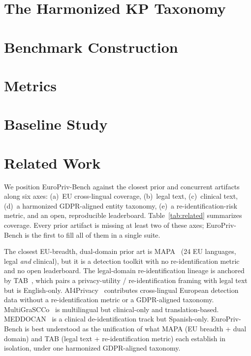 \documentclass[11pt]{article}
\begin{document}
\section{The Harmonized KP Taxonomy}

\section{Benchmark Construction}

\section{Metrics}

\section{Baseline Study}

\section{Related Work}
\label{sec:related}
We position EuroPriv-Bench against the closest prior and concurrent artifacts along six axes:
(a)~EU cross-lingual coverage, (b)~legal text, (c)~clinical text, (d)~a harmonized GDPR-aligned
entity taxonomy, (e)~a re-identification-risk metric, and an open, reproducible leaderboard.
Table~\ref{tab:related} summarizes coverage. Every prior artifact is missing at least two of these
axes; EuroPriv-Bench is the first to fill all of them in a single suite.

The closest EU-breadth, dual-domain prior art is MAPA~\cite{mapa_toolkit} (24 EU languages, legal
\emph{and} clinical), but it is a detection toolkit with no re-identification metric and no open
leaderboard. The legal-domain re-identification lineage is anchored by TAB~\cite{pilan2022tab},
which pairs a privacy-utility / re-identification framing with legal text but is English-only.
AI4Privacy~\cite{ai4privacy_openpii} contributes cross-lingual European detection data without a
re-identification metric or a GDPR-aligned taxonomy. MultiGraSCCo~\cite{multigrascco2026} is
multilingual but clinical-only and translation-based. MEDDOCAN~\cite{meddocan2019} is a
clinical de-identification track but Spanish-only. EuroPriv-Bench is best understood as the
unification of what MAPA (EU breadth + dual domain) and TAB (legal text + re-identification
metric) each establish in isolation, under one harmonized GDPR-aligned taxonomy.
\end{document}
